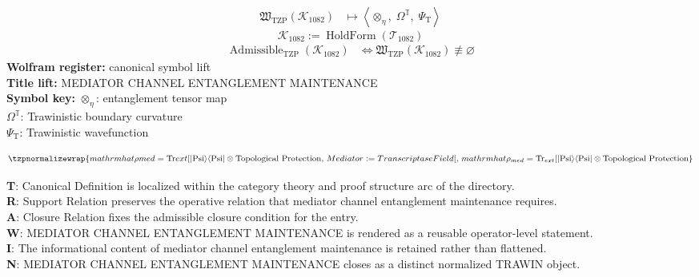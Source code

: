 \noindent
\begin{minipage}[t]{0.48\linewidth}
\begingroup
\small
\[
\begin{aligned}
\mathfrak{W}_{\mathrm{TZP}}\!\left(\mathcal{K}_{1082}\right)
&\longmapsto
\left\langle \otimes_{\eta},\; \Omega^{\mathbb{T}},\; \Psi_{\mathrm{T}} \right\rangle
\end{aligned}
\]
\[
\mathcal{K}_{1082}
:=
\operatorname{HoldForm}\!\left(\mathcal{T}_{1082}\right)
\]
\[
\begin{aligned}
\operatorname{Admissible}_{\mathrm{TZP}}\!\left(\mathcal{K}_{1082}\right)
&\Longleftrightarrow
\mathfrak{W}_{\mathrm{TZP}}\!\left(\mathcal{K}_{1082}\right)\not\equiv\varnothing
\end{aligned}
\]
\textbf{Wolfram register:} canonical symbol lift\\
\textbf{Title lift:} MEDIATOR CHANNEL ENTANGLEMENT MAINTENANCE\\
\textbf{Symbol key:} \(\otimes_{\eta}\): entanglement tensor map\\ \(\Omega^{\mathbb{T}}\): Trawinistic boundary curvature\\ \(\Psi_{\mathrm{T}}\): Trawinistic wavefunction
\par
\endgroup
\end{minipage}\hfill
\begin{minipage}[t]{0.48\linewidth}
\[
\tzpnormalizewrap{mathrm{hat}{\rho} {med} = \text{Tr} {ext}[\lvert \mathrm{Psi} \rangle \langle \mathrm{Psi}| \otimes \text{Topological Protection},\,Mediator := TranscriptaseField[,\,mathrm{hat}{\rho}_{med} = \text{Tr}_{ext}[\lvert \mathrm{Psi} \rangle \langle \mathrm{Psi}| \otimes \text{Topological Protection}}
\]

\small
\textbf{T}: Canonical Definition is localized within the category theory and proof structure arc of the directory.\\
\textbf{R}: Support Relation preserves the operative relation that mediator channel entanglement maintenance requires.\\
\textbf{A}: Closure Relation fixes the admissible closure condition for the entry.\\
\textbf{W}: MEDIATOR CHANNEL ENTANGLEMENT MAINTENANCE is rendered as a reusable operator-level statement.\\
\textbf{I}: The informational content of mediator channel entanglement maintenance is retained rather than flattened.\\
\textbf{N}: MEDIATOR CHANNEL ENTANGLEMENT MAINTENANCE closes as a distinct normalized TRAWIN object.
\normalsize
\end{minipage}

